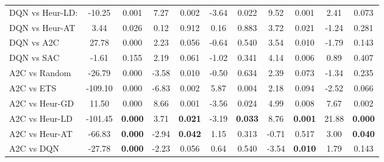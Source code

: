 \begin{tabular}{lcccccccccc}
	DQN vs Heur-LD:  & -10.25          & 0.001                 & 7.27           & 0.002                  & -3.64          & 0.022                  & 9.52           & 0.001                  & 2.41           & 0.073                  \\
	DQN vs Heur-AT   & 3.44            & 0.026                 & 0.12           & 0.912                  & 0.16           & 0.883                  & 3.72           & 0.021                  & -1.24          & 0.281                  \\
	DQN vs A2C       & 27.78           & 0.000                 & 2.23           & 0.056                  & -0.64          & 0.540                  & 3.54           & 0.010                  & -1.79          & 0.143                  \\
	DQN vs SAC       & -1.61           & 0.155                 & 2.19           & 0.061                  & -1.02          & 0.341                  & 4.14           & 0.006                  & 0.89           & 0.407                  \\
	\midrule 
	A2C vs Random    & -26.79          & 0.000                 & -3.58          & 0.010                  & -0.50          & 0.634                  & 2.39           & 0.073                  & -1.34          & 0.235                  \\
	A2C vs ETS       & -109.10         & 0.000                 & -6.83          & 0.002                  & 5.87           & 0.004                  & 2.18           & 0.094                  & -2.52          & 0.066                  \\
	A2C vs Heur-GD   & 11.50           & 0.000                 & 8.66           & 0.001                  & -3.56          & 0.024                  & 4.99           & 0.008                  & 7.67           & 0.002                  \\
	A2C vs Heur-LD   & -101.45         & \textbf{0.000}        & 3.71           & \textbf{0.021}         & -3.19          & \textbf{0.033}         & 8.76           & \textbf{0.001}         & 21.88          & \textbf{0.000}         \\
	A2C vs Heur-AT   & -66.83          & \textbf{0.000}        & -2.94          & \textbf{0.042}         & 1.15           & 0.313                  & -0.71          & 0.517                  & 3.00           & \textbf{0.040}         \\
	A2C vs DQN       & -27.78          & \textbf{0.000}        & -2.23          & 0.056                  & 0.64           & 0.540                  & -3.54          & \textbf{0.010}         & 1.79           & 0.143                  \\

\end{tabular}
